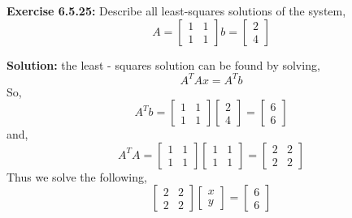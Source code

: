 \documentclass{amsart}
\begin{document}
\begin{enumerate}
\begin{enumerate}
\noindent\textbf{Exercise 6.5.25: } Describe all least-squares solutions of the system,
\begin{equation*}
A = 
\begin{bmatrix}
1&1\\
1&1
\end{bmatrix}
b = 
\begin{bmatrix}
2\\
4
\end{bmatrix}
\end{equation*}

\textbf{Solution: } the least - squares solution can be found by solving, 
\begin{equation*}
A^TAx = A^Tb
\end{equation*}
So,
\begin{equation*}
A^Tb = 
\begin{bmatrix}
1&1\\
1&1
\end{bmatrix}
\begin{bmatrix}
2\\
4
\end{bmatrix}
 = 
 \begin{bmatrix}
6\\
6
\end{bmatrix}
\end{equation*}
and,
\begin{equation*}
A^TA = 
\begin{bmatrix}
1&1\\
1&1
\end{bmatrix}
\begin{bmatrix}
1&1\\
1&1
\end{bmatrix}
 = 
 \begin{bmatrix}
2&2\\
2&2
\end{bmatrix}
\end{equation*}
Thus we solve the following,
\begin{equation*}
 \begin{bmatrix}
2&2\\
2&2
\end{bmatrix}
\begin{bmatrix}
x\\
y
\end{bmatrix}
 = 
\begin{bmatrix}
6\\
6
\end{bmatrix}
\end{equation*}

\end{enumerate}
\end{enumerate}
\end{document}
